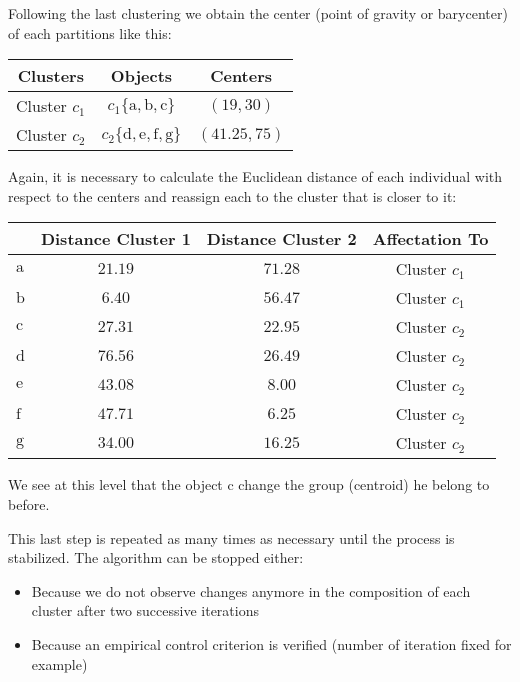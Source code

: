 	Following the last clustering we obtain the center (point of gravity or barycenter) of each partitions like this:
	\begin{table}[H]
		\centering
		\begin{tabular}{|c|c|c|}
		\hline
		\rowcolor[HTML]{9B9B9B} 
		\textbf{Clusters} & \textbf{Objects} & \textbf{Centers} \\ \hline
		Cluster $c_1$ & $c_1\{\mathrm{a},\mathrm{b},\mathrm{c}\}$ & $(19,30)$ \\ \hline
		Cluster $c_2$ & $c_2\{\mathrm{d},\mathrm{e},\mathrm{f},\mathrm{g}\}$ & $(41.25,75)$ \\ \hline
		\end{tabular}
	\end{table}
	Again, it is necessary to calculate the Euclidean distance of each individual with respect to the centers and reassign each to the cluster that is closer to it:
	\begin{table}[H]
		\centering
		\begin{tabular}{|l|c|c|c|}
		\hline
		\rowcolor[HTML]{9B9B9B} 
		\multicolumn{1}{|c|}{\cellcolor[HTML]{9B9B9B}\textbf{Objects}} & \textbf{Distance Cluster 1} & \textbf{Distance Cluster 2} & \textbf{Affectation To} \\ \hline
		$\mathrm{a}$ & $21.19$ & $71.28$ & Cluster $c_1$ \\ \hline
		$\mathrm{b}$ & $6.40$ & $56.47$ & Cluster $c_1$ \\ \hline
		$\mathrm{c}$ & $27.31$ & $22.95$ & Cluster $c_2$ \\ \hline
		$\mathrm{d}$ & $76.56$ & $26.49$ & Cluster $c_2$ \\ \hline
		$\mathrm{e}$ & $43.08$ & $8.00$ & Cluster $c_2$ \\ \hline
		$\mathrm{f}$ & $47.71$ & $6.25$ & Cluster $c_2$ \\ \hline
		$\mathrm{g}$ & $34.00$ & $16.25$ & Cluster $c_2$ \\ \hline
		\end{tabular}
	\end{table}
	We see at this level that the object $\mathrm{c}$ change the group (centroid) he belong to before.
	
	This last step is repeated as many times as necessary until the process is stabilized. The algorithm can be stopped either:
	\begin{itemize}
		\item Because we do not observe changes anymore in the composition of each cluster after two successive iterations
		
		\item Because an empirical control criterion is verified (number of iteration fixed for example)
	\end{itemize}

